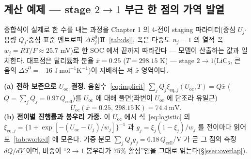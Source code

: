 \documentclass[11pt,a4paper]{article}
\newcommand{\eq}{\mathrm{eq}}
\newcommand{\oc}{\mathrm{oc}}
\newcommand{\cell}{\mathrm{cell}}
\begin{document}
\subsection{계산 예제 — stage $2\!\to\!1$ 부근 한 점의 가역 발열}\label{ssec:worked}
종합식이 실제로 한 수를 내는 과정을 Chapter 1 의 4-전이 staging 파라미터(중심 $U_j$$\cdot$용량 $Q_j$$\cdot$중심 표준
엔트로피 $\Delta S^0_j$[표~\ref{tab:ds}], 폭은 다중도 $n_j{=}1$ 의 열적 폭 $w_j{=}RT/F\!\approx\!25.7$ mV)로 한 SOC 에서
끝까지 따라간다 --- 모델이 산출하는 값과 일치한다. 대표점은 탈리튬화 분율 $\bar x=0.25$
($T=298.15$ K) --- stage $2\!\to\!1$($\mathrm{LiC_6}$, 큰 음의 $\Delta S^0=-16$ J\,mol$^{-1}$K$^{-1}$)이 지배하는 저-$\bar x$ 영역이다.

\textbf{(a) 전하 보존으로 $U_\oc$ 결정.} 음함수~\eqref{eq:implicit} $\sum_jQ_j\xi_{\eq,j}(U_\oc,T)=Q\bar x$
($Q=\sum_jQ_j=0.97\,Q_\cell$)를 $U_\oc$ 에 대해 풀면(좌변이 $U_\oc$ 에 단조라 유일근)
\begin{equation*}
U_\oc(\bar x{=}0.25,\,298.15\,\mathrm K)=74.4\ \mathrm{mV}.
\end{equation*}
\textbf{(b) 전이별 진행률과 봉우리 가중.} 이 $U_\oc$ 에서 식~\eqref{eq:logistic} 의
$\xi_{\eq,j}=\{1{+}\exp[-(U_\oc-U_j)/w_j]\}^{-1}$ 과 $g_j=\xi_j(1-\xi_j)/w_j$ 를 전이마다 읽어 표~\ref{tab:worked} 에
모은다. 가중 분모 $\sum_jQ_jg_j=6.18\,Q_\cell$/V 가 곧 그 점의 측정 $dQ/dV$ 이며, 비중이 ``$2\!\to\!1$ 봉우리가
$75\%$ 활성''임을 그대로 읽는다(\S\ref{ssec:overlap}).
\end{document}
